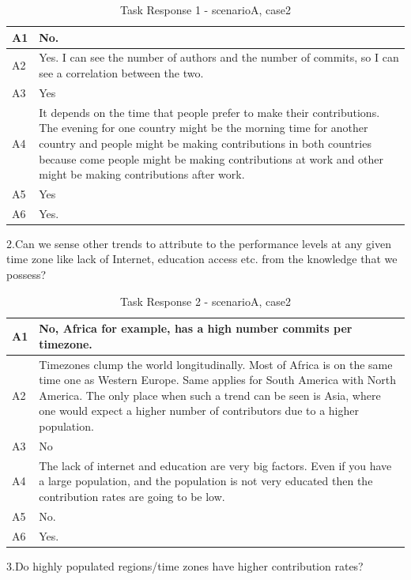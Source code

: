 \documentclass[seploa]{beavtex}
\begin{document}
\begin{appendices}
\begin{table}[H]
\begin{tabular}{ |p{2cm}|p{12cm}| }
 \hline
 A1 & No.\\
 \hline
 A2 & Yes. I can see the number of authors and the number of commits, so I can see a correlation between the two.\\ \hline
 A3 & Yes\\ \hline
 A4 & It depends on the time that people prefer to make their contributions. The evening for one country might be the morning time for another country and people might be making contributions in both countries because come people might be making contributions at work and other might be making contributions after work.\\ \hline
 A5 & Yes\\ \hline
 A6 & Yes.\\
 \hline
\end{tabular}
\caption{Task Response 1 - scenarioA, case2}
\label{tab:table11}
\end{table}

2.Can we sense other trends to attribute to the performance levels at any given time zone like lack of Internet, education access etc. from the knowledge that we possess?

\begin{table}[H]
\begin{tabular}{ |p{2cm}|p{12cm}| }
 \hline
 A1 & No, Africa for example, has a high number commits per timezone.\\
 \hline
 A2 & Timezones clump the world longitudinally. Most of Africa is on the same time one as Western Europe. Same applies for South America with North America. The only place when such a trend can be seen is Asia, where one would expect a higher number of contributors due to a higher population.\\ \hline
 A3 & No\\ \hline
 A4 & The lack of internet and education are very big factors. Even if you have a large population, and the population is not very educated then the contribution rates are going to be low.\\ \hline
 A5 & No.\\ \hline
 A6 & Yes.\\
 \hline
\end{tabular}
\caption{Task Response 2 - scenarioA, case2}
\label{tab:table12}
\end{table}

3.Do highly populated regions/time zones have higher contribution rates?


\end{appendices}
\end{document}
